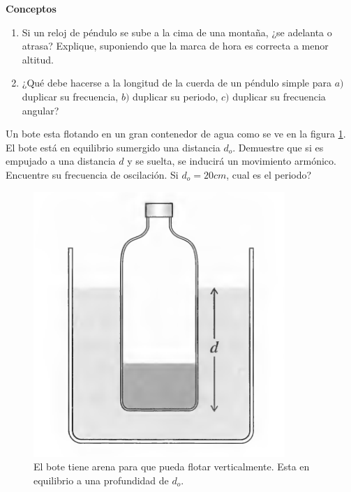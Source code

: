 \begin{mdframed}[style=warning]
	\textbf{Conceptos}
		\begin{enumerate}
			\item Si un reloj de péndulo se sube a la cima de una montaña, ¿se adelanta o atrasa? Explique, suponiendo que la marca de hora es correcta a menor altitud.
			\item ¿Qué debe hacerse a la longitud de la cuerda de un péndulo simple para $a)$ duplicar su frecuencia, $b)$ duplicar su periodo, $c)$ duplicar su frecuencia angular?
		\end{enumerate}
\end{mdframed}






\begin{mdframed}[style=warning]
	\begin{ejercicio}
		Un bote esta flotando en un gran contenedor de agua como se ve en la figura \ref{ej4}. El bote está en equilibrio sumergido una distancia $d_o$. Demuestre que si es empujado a una distancia $d$ y se suelta, se inducirá un movimiento armónico. Encuentre su frecuencia de oscilación. Si $d_o = 20cm$, cual es el periodo?
		
		\begin{figure}[H]
			\centering
			\includegraphics[scale=0.3]{./img/ej4.png}
			\caption{\centering El bote tiene arena para que pueda flotar verticalmente. Esta en equilibrio a una profundidad de $d_o$.}
			\label{ej4}
		\end{figure}
	\end{ejercicio}
\end{mdframed}


























